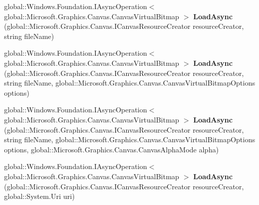 \begin{DoxyCompactItemize}
\item 
\mbox{\label{interface_microsoft_1_1_graphics_1_1_canvas_1_1_i_canvas_virtual_bitmap_statics_a330ce31be0bdb0b0a0d703fabfad4773}} 
global\+::\+Windows.\+Foundation.\+I\+Async\+Operation$<$ global\+::\+Microsoft.\+Graphics.\+Canvas.\+Canvas\+Virtual\+Bitmap $>$ {\bfseries Load\+Async} (global\+::\+Microsoft.\+Graphics.\+Canvas.\+I\+Canvas\+Resource\+Creator resource\+Creator, string file\+Name)
\item 
\mbox{\label{interface_microsoft_1_1_graphics_1_1_canvas_1_1_i_canvas_virtual_bitmap_statics_a76a39d531ac6da083f15563d74ccbb82}} 
global\+::\+Windows.\+Foundation.\+I\+Async\+Operation$<$ global\+::\+Microsoft.\+Graphics.\+Canvas.\+Canvas\+Virtual\+Bitmap $>$ {\bfseries Load\+Async} (global\+::\+Microsoft.\+Graphics.\+Canvas.\+I\+Canvas\+Resource\+Creator resource\+Creator, string file\+Name, global\+::\+Microsoft.\+Graphics.\+Canvas.\+Canvas\+Virtual\+Bitmap\+Options options)
\item 
\mbox{\label{interface_microsoft_1_1_graphics_1_1_canvas_1_1_i_canvas_virtual_bitmap_statics_af2af584f62356eb886a700899215d4a6}} 
global\+::\+Windows.\+Foundation.\+I\+Async\+Operation$<$ global\+::\+Microsoft.\+Graphics.\+Canvas.\+Canvas\+Virtual\+Bitmap $>$ {\bfseries Load\+Async} (global\+::\+Microsoft.\+Graphics.\+Canvas.\+I\+Canvas\+Resource\+Creator resource\+Creator, string file\+Name, global\+::\+Microsoft.\+Graphics.\+Canvas.\+Canvas\+Virtual\+Bitmap\+Options options, global\+::\+Microsoft.\+Graphics.\+Canvas.\+Canvas\+Alpha\+Mode alpha)
\item 
\mbox{\label{interface_microsoft_1_1_graphics_1_1_canvas_1_1_i_canvas_virtual_bitmap_statics_a230e794a4930f665b4ac7d220c2671da}} 
global\+::\+Windows.\+Foundation.\+I\+Async\+Operation$<$ global\+::\+Microsoft.\+Graphics.\+Canvas.\+Canvas\+Virtual\+Bitmap $>$ {\bfseries Load\+Async} (global\+::\+Microsoft.\+Graphics.\+Canvas.\+I\+Canvas\+Resource\+Creator resource\+Creator, global\+::\+System.\+Uri uri)
\item 
\mbox{\label{interface_microsoft_1_1_graphics_1_1_canvas_1_1_i_canvas_virtual_bitmap_statics_ae4cad80705e97acdc853863be82a2edd}} 

\end{DoxyCompactItemize}
